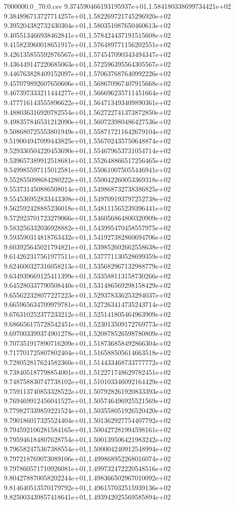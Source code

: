 \begin{filecontents*}{7000000.0_70.0.csv}
9.374590466193195937e+01,1.584180338699734421e+02
9.384896713727714257e+01,1.582269721745296920e+02
9.395204382732430304e+01,1.580351087650460613e+02
9.405513466938462841e+01,1.578424437191515608e+02
9.415823960018651917e+01,1.576489771156202551e+02
9.426135855592876567e+01,1.574547090343494347e+02
9.436449147220685063e+01,1.572596395564305567e+02
9.446763828409152097e+01,1.570637687640992226e+02
9.457079892607650606e+01,1.568670967407915668e+02
9.467397333211444277e+01,1.566696235711451664e+02
9.477716143555896622e+01,1.564713493409890361e+02
9.488036316920782554e+01,1.562722741373872850e+02
9.498357846531212090e+01,1.560723980486427536e+02
9.508680725553801949e+01,1.558717211642679104e+02
9.519004947099443825e+01,1.556702435750648874e+02
9.529330504220453690e+01,1.554679653731054714e+02
9.539657389912518681e+01,1.552648866517256465e+02
9.549985597115012581e+01,1.550610075055446941e+02
9.552855098684280222e+01,1.550042260053369318e+02
9.553731450886508014e+01,1.549868732738386825e+02
9.554536952833443308e+01,1.549709193797252738e+02
9.562592428885236018e+01,1.548111565239396441e+02
9.572923701723279066e+01,1.546056864800320909e+02
9.583256332036928882e+01,1.543995470458557975e+02
9.593590314818763432e+01,1.541927382860694706e+02
9.603925645021794821e+01,1.539852602662558638e+02
9.614262317561977511e+01,1.537771130528699359e+02
9.624600327316058213e+01,1.535682967132988779e+02
9.634939669125411399e+01,1.533588113158730266e+02
9.645280337790508440e+01,1.531486569298158429e+02
9.655622328077227223e+01,1.529378336253294037e+02
9.665965634709979781e+01,1.527263414735243714e+02
9.676310252377233212e+01,1.525141805464963909e+02
9.686656175728542451e+01,1.523013509172769773e+02
9.697003399374901278e+01,1.520878526598780809e+02
9.707351917890716209e+01,1.518736858492866304e+02
9.717701725807802404e+01,1.516588505614663518e+02
9.728052817624582360e+01,1.514433468733777772e+02
9.738405187798854001e+01,1.512271748629782451e+02
9.748758830747738102e+01,1.510103346092164429e+02
9.759113740853328522e+01,1.507928261920833393e+02
9.769469912456041527e+01,1.505746496925521569e+02
9.779827339859221524e+01,1.503558051926520420e+02
9.790186017325524404e+01,1.501362927754407792e+02
9.794592106281584165e+01,1.500427281994598161e+02
9.795946184807628754e+01,1.500139506421983242e+02
9.796582475367388554e+01,1.500004240912548994e+02
9.797218769073089106e+01,1.499868952268016074e+02
9.797860571710926081e+01,1.499732472220548516e+02
9.804278870058202244e+01,1.498366502967010092e+02
9.814640513570179792e+01,1.496157032515939136e+02
9.825003439857418641e+01,1.493942025569585894e+02

\end{filecontents*}
